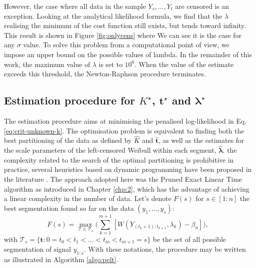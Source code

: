 However, the case where all data in the sample $Y_s,\dots,Y_t$ are censored is an exception. Looking at the analytical likelihood formula, we find that the $\lambda$ realising the minimum of the cost function still exists, but tends toward infinity. This result is shown in Figure \ref{fig:onlycens} where We can see it is the case for any $\sigma$ value. To solve this problem from a computational point of view, we impose an upper bound on the possible values of lambda. In the remainder of this work, the maximum value of $\lambda$ is set to $10^6$. When the value of the estimate exceeds this threshold, the Newton-Raphson procedure terminates.

\subsection{Estimation procedure for \texorpdfstring{$K^{\star}$}{K*}, \texorpdfstring{$\bm t^{\star}$}{t*} and \texorpdfstring{$\bm \lambda^{\star}$}{l*}}\label{sub:pelt}

The estimation procedure aims at minimising the penalised log-likelihood in Eq. \ref{eq:crit-unknown-k}. The optimisation problem is equivalent to finding both the best partitioning of the data as defined by $\hat{K}$ and $\hat{\bm t}$, as well as the estimates for the scale parameters of the left-censored Weibull within each segment, $\hat{\bm \lambda}$. the complexity related to the search of the optimal partitioning is prohibitive in practice, several heuristics based on dynamic programming have been proposed in the literature \cite{Maidstone2016,Jackson2005,Jensen1969,Os2004}. The approach adopted here was the Pruned Exact Linear Time algorithm \cite{Killick2012} as introduced in Chapter \ref{chp:2}, which has the advantage of achieving a linear complexity in the number of data. Let's denote $F(s)$ for $s\in [1:n]$ the best segmentation found so far on the data $(y_1,...,y_s)$:  
$$F(s) = \max_{\bm{\mathcal{T}}\in\mathcal{T}_s}\bigg(\sum_{k=1}^{m+1}[W(Y_{(t_{k}+1) : t_{k+1}}, \lambda_{k}) - \beta_{n}]\bigg),$$
with $\mathcal{T}_s = \{\bm{t} :0 = t_0 < t_1 <...<t_m <t_{m+1} = s\}$  be the set of all possible segmentation of signal $y_{1:s}$. With these notations, the procedure may be written as illustrated in Algorithm \ref{algo:pelt}.

